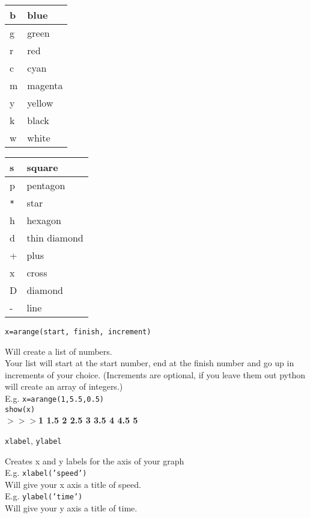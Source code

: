 \begin{center}
\begin{tabular}{|l | p{2cm}|}
\hline
b & blue\\\hline
g & green\\\hline
r & red\\\hline
c & cyan\\\hline
m & magenta\\\hline
y & yellow\\\hline
k & black\\\hline
w & white \\\hline
\end{tabular}
\hspace{4ex} 
\begin{tabular}{|l | p{3cm}|}
\hline
s & square\\\hline
p & pentagon\\\hline
\texttt{*} & star\\\hline
h & hexagon\\\hline
d & thin diamond\\\hline
+ & plus\\\hline
x & cross\\\hline
D & diamond\\\hline
- & line\\\hline
\end{tabular}
\end{center}

\newpage
\noindent \texttt{x=arange(start, finish, increment)}
\begin{myindentpar}{1.4cm}
\vspace*{-1ex}
Will create a list of numbers.\\
Your list will start at the start number, end at the finish number and go up in increments of your choice. (Increments are optional, if you leave them out python will create an array of integers.)\\
E.g. \texttt{x=arange(1,5.5,0.5)}\\
\texttt{show(x)}\\
\textbf{$>>>$1 1.5 2 2.5 3 3.5 4 4.5 5}
\end{myindentpar}


\noindent \texttt{xlabel}, \texttt{ylabel}
\begin{myindentpar}{1.4cm}
\vspace*{-1ex}
Creates x and y labels for the axis of your graph\\
E.g. \texttt{xlabel('speed')}\\
Will give your x axis a title of speed.\\
E.g. \texttt{ylabel('time')}\\
Will give your y axis a title of time.
\end{myindentpar}

